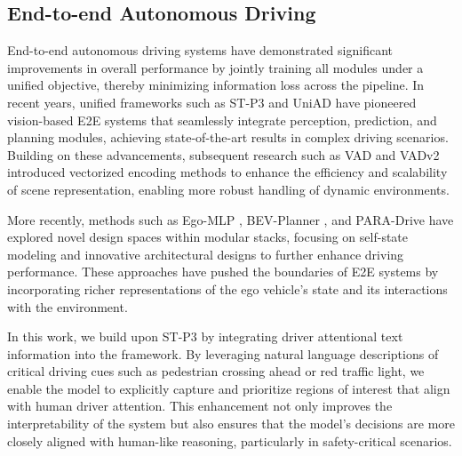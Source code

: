 \subsection{End-to-end Autonomous Driving} 
End-to-end autonomous driving systems have demonstrated significant improvements in overall performance by jointly training all modules under a unified objective, thereby minimizing information loss across the pipeline. In recent years, unified frameworks such as ST-P3 \cite{hu2022st} and UniAD \cite{hu2023planning} have pioneered vision-based E2E systems that seamlessly integrate perception, prediction, and planning modules, achieving state-of-the-art results in complex driving scenarios. Building on these advancements, subsequent research such as VAD \cite{jiang2023vad} and VADv2 \cite{chen2024vadv2} introduced vectorized encoding methods to enhance the efficiency and scalability of scene representation, enabling more robust handling of dynamic environments.

More recently, methods such as Ego-MLP \cite{zhai2023rethinking}, BEV-Planner \cite{li2024ego}, and PARA-Drive \cite{weng2024drive} have explored novel design spaces within modular stacks, focusing on self-state modeling and innovative architectural designs to further enhance driving performance. These approaches have pushed the boundaries of E2E systems by incorporating richer representations of the ego vehicle’s state and its interactions with the environment.

In this work, we build upon ST-P3 by integrating driver attentional text information into the framework. By leveraging natural language descriptions of critical driving cues such as pedestrian crossing ahead or red traffic light, we enable the model to explicitly capture and prioritize regions of interest that align with human driver attention. This enhancement not only improves the interpretability of the system but also ensures that the model’s decisions are more closely aligned with human-like reasoning, particularly in safety-critical scenarios.

